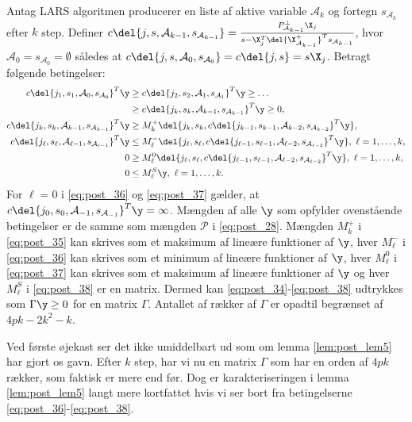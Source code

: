\begin{lem} \label{lem:post_lem5}
Antag LARS algoritmen producerer en liste af aktive variable \(\mathcal{A}_k\) og fortegn \(s_{\mathcal{A}_k}\) efter \(k\) step.
Definer \(c \del{j, s, \mathcal{A}_{k-1}, s_{\mathcal{A}_{k-1}}} = \frac{P_{\mathcal{A}_{k-1}}^\perp \X_{j}}{s - \X_{j}^T \del{\X_{\mathcal{A}_{k-1}}^+}^T s_{\mathcal{A}_{k-1}}}\), hvor \(\mathcal{A}_0 = s_{\mathcal{A}_0} = \emptyset\) således at \(c \del{j, s, \mathcal{A}_{0}, s_{\mathcal{A}_0}} = c \del{j,s} = s \X_j\).
Betragt følgende betingelser:
\begin{align}
c \del{j_1, s_1, \mathcal{A}_0, s_{\mathcal{A}_0}}^T \y &\geq c \del{j_2, s_2, \mathcal{A}_1, s_{\mathcal{A}_1}}^T \y \geq \dots \nonumber \\
&\geq  c \del{j_k, s_k, \mathcal{A}_{k-1}, s_{\mathcal{A}_{k-1}}}^T \y \geq 0, \label{eq:post_34} \\
c \del{j_k, s_k, \mathcal{A}_{k-1}, s_{\mathcal{A}_{k-1}}}^T \y &\geq M_k^+ \del{j_k, s_k, c \del{j_{k-1}, s_{k-1}, \mathcal{A}_{k-2}, s_{\mathcal{A}_{k-2}}}^T \y}, \label{eq:post_35} \\
c \del{j_\ell, s_\ell, \mathcal{A}_{\ell-1}, s_{\mathcal{A}_{\ell-1}}}^T \y &\leq M_\ell^- \del{j_\ell, s_\ell, c \del{j_{\ell-1}, s_{\ell-1}, \mathcal{A}_{\ell-2}, s_{\mathcal{A}_{\ell-2}}}^T \y}, \ \ell = 1, \ldots, k, \label{eq:post_36} \\
0 &\geq M_\ell^0 \del{j_\ell, s_\ell, c \del{j_{\ell-1}, s_{\ell-1}, \mathcal{A}_{\ell-2}, s_{\mathcal{A}_{\ell-2}}}^T \y}, \ \ell = 1, \ldots, k, \label{eq:post_37} \\
0 &\leq M_\ell^S \y,  \ \ell = 1, \ldots, k. \label{eq:post_38}
\end{align}
For \(\ell = 0\) i \eqref{eq:post_36} og \eqref{eq:post_37} gælder, at \(c \del{j_0, s_0, \mathcal{A}_{-1}, s_{\mathcal{A}_{-1}}}^T \y = \infty\).
Mængden af alle \(\y\) som opfylder ovenstående betingelser er de samme som mængden \(\mathcal{P}\) i \eqref{eq:post_28}.
Mængden \(M_k^+\) i \eqref{eq:post_35} kan skrives som et maksimum af lineære funktioner af \(\y\), hver \(M_\ell^-\) i \eqref{eq:post_36} kan skrives som et minimum af lineære funktioner af \(\y\), hver \(M_\ell^0\) i \eqref{eq:post_37} kan skrives som et maksimum af lineære funktioner af \(\y\) og hver \(M_\ell^S\) i \eqref{eq:post_38} er en matrix.
Dermed kan \eqref{eq:post_34}-\eqref{eq:post_38} udtrykkes som \(\Gamma \y \geq 0\) for en matrix \(\Gamma\).
Antallet af rækker af \(\Gamma\) er opadtil begrænset af \(4pk - 2 k^2 -k\).
\end{lem}
%
Ved første øjekast ser det ikke umiddelbart ud som om lemma \ref{lem:post_lem5} har gjort os gavn.
Efter \(k\) step, har vi nu en matrix \(\Gamma\) som har en orden af \(4pk\) rækker, som faktisk er mere end før.
Dog er karakteriseringen i lemma \ref{lem:post_lem5} langt mere kortfattet hvis vi ser bort fra betingelserne \eqref{eq:post_36}-\eqref{eq:post_38}.

